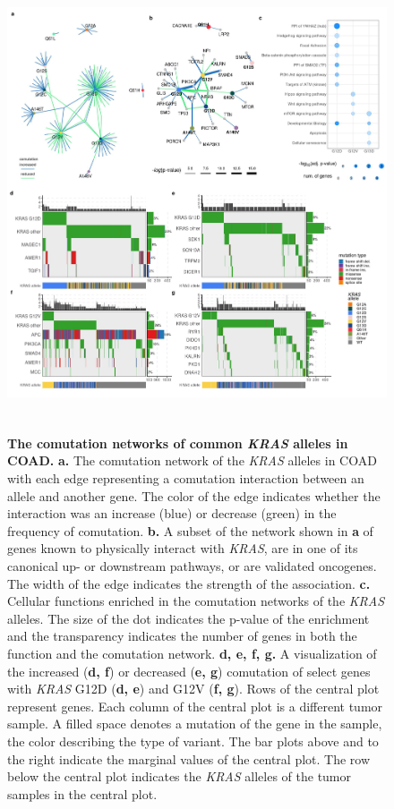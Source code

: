 \documentclass[english, 10pt, letterpaper]{article}
\newcommand{\KRAS}{\emph{KRAS}}
\begin{document}
\begin{figure}[p]
\centering
\includegraphics[height=135mm]{figures/Fig_2.jpeg}
\caption{
    \textbf{The comutation networks of common \KRAS{} alleles in COAD.}
    \textbf{a.} The comutation network of the \KRAS{} alleles in COAD with each edge representing a comutation interaction between an allele and another gene. The color of the edge indicates whether the interaction was an increase (blue) or decrease (green) in the frequency of comutation.
    \textbf{b.} A subset of the network shown in \textbf{a} of genes known to physically interact with \KRAS{}, are in one of its canonical up- or downstream pathways, or are validated oncogenes. The width of the edge indicates the strength of the association.
    \textbf{c.} Cellular functions enriched in the comutation networks of the \KRAS{} alleles. The size of the dot indicates the p-value of the enrichment and the transparency indicates the number of genes in both the function and the comutation network.
    \textbf{d, e, f, g.} A visualization of the increased (\textbf{d, f}) or decreased (\textbf{e, g}) comutation of select genes with \KRAS{} G12D (\textbf{d, e}) and G12V (\textbf{f, g}). Rows of the central plot represent genes. Each column of the central plot is a different tumor sample. A filled space denotes a mutation of the gene in the sample, the color describing the type of variant. The bar plots above and to the right indicate the marginal values of the central plot. The row below the central plot indicates the \KRAS{} alleles of the tumor samples in the central plot.
}
\label{fig:coad-comutation-main}
\end{figure}
\end{document}
